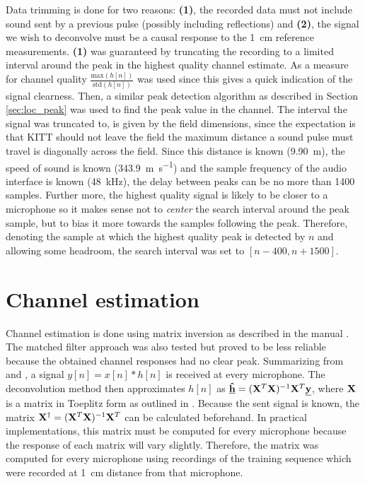 \documentclass[11pt,titlepage]{report}
\begin{document}
Data trimming is done for two reasons: \textbf{(1)}, the recorded data must not include sound sent by a previous pulse (possibly including reflections) and \textbf{(2)}, the signal we wish to deconvolve must be a causal response to the \SI{1}{\centi\meter} reference measurements. \textbf{(1)} was guaranteed by truncating the recording to a limited interval around the peak in the highest quality channel estimate. As a measure for channel quality $\frac{\text{max}(h[n])}{\text{std}(h[n])}$ was used since this gives a quick indication of the signal clearness. Then, a similar peak detection algorithm as described in Section \ref{sec:loc_peak} was used to find the peak value in the channel. The interval the signal was truncated to, is given by the field dimensions, since the expectation is that KITT should not leave the field the maximum distance a sound pulse must travel is diagonally across the field. Since this distance is known (\SI{9.90}{\meter}), the speed of sound is known (\SI{343.9}{\meter\per\second}) and the sample frequency of the audio interface is known (\SI{48}{\kilo\hertz}), the delay between peaks can be no more than \num{1400} samples. Further more, the highest quality signal is likely to be closer to a microphone so it makes sense not to \textit{center} the search interval around the peak sample, but to bias it more towards the samples following the peak. Therefore, denoting the sample at which the highest quality peak is detected by $n$ and allowing some headroom, the search interval was set to $[n - 400, n + 1500]$.

\section{Channel estimation}
\label{sec:loc_est_h}
Channel estimation is done using matrix inversion as described in the manual \cite{epo4-manual}. The matched filter approach was also tested but proved to be less reliable because the obtained channel responses had no clear peak. Summarizing from \cite{epo4-manual} and \cite{epo4-del7}, a signal $y[n]=x[n]*h[n]$ is received at every microphone. The deconvolution method then approximates $h[n]$ as $\mathbf{\underline{\hat{h}}}=(\mathbf{X}^T\mathbf{X})^{-1}\mathbf{X}^T\mathbf{\underline{y}}$, where $\mathbf{X}$ is a matrix in Toeplitz form as outlined in \cite{epo4-manual}. Because the sent signal is known, the matrix $\mathbf{X}^\dagger=(\mathbf{X}^T\mathbf{X})^{-1}\mathbf{X}^T$ can be calculated beforehand. In practical implementations, this matrix must be computed for every microphone because the response of each matrix will vary slightly. Therefore, the matrix was computed for every microphone using recordings of the training sequence which were recorded at \SI{1}{cm} distance from that microphone.
\end{document}
